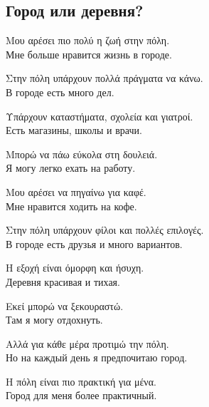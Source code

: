 \documentclass[12pt]{article}
\newcommand{\my}[1]{\textcolor{gray!80!white}{#1}}
\newenvironment{page}{\clearpage\normalsize\null\vfill}{\vfill\null}
\newenvironment{textblock}{\begin{minipage}{\textwidth}}{\end{minipage}\smallskip}
\begin{document}
	\begin{page}
		\subsection{Город или деревня?}
		\small
		\begin{textblock}
			Μου αρέσει πιο πολύ η ζωή στην πόλη.\\
			\my{Мне больше нравится жизнь в городе.}
			
			Στην πόλη υπάρχουν πολλά πράγματα να κάνω.\\
			\my{В городе есть много дел.}
			
			Υπάρχουν καταστήματα, σχολεία και γιατροί.\\
			\my{Есть магазины, школы и врачи.}
			
			Μπορώ να πάω εύκολα στη δουλειά.\\
			\my{Я могу легко ехать на работу.}
			
			Μου αρέσει να πηγαίνω για καφέ.\\
			\my{Мне нравится ходить на кофе.}
			
			Στην πόλη υπάρχουν φίλοι και πολλές επιλογές.\\
			\my{В городе есть друзья и много вариантов.}
			
			Η εξοχή είναι όμορφη και ήσυχη.\\
			\my{Деревня красивая и тихая.}
			
			Εκεί μπορώ να ξεκουραστώ.\\
			\my{Там я могу отдохнуть.}
			
			Αλλά για κάθε μέρα προτιμώ την πόλη.\\
			\my{Но на каждый день я предпочитаю город.}
			
			Η πόλη είναι πιο πρακτική για μένα.\\
			\my{Город для меня более практичный.}
		\end{textblock}
	\end{page}
	
\end{document}
